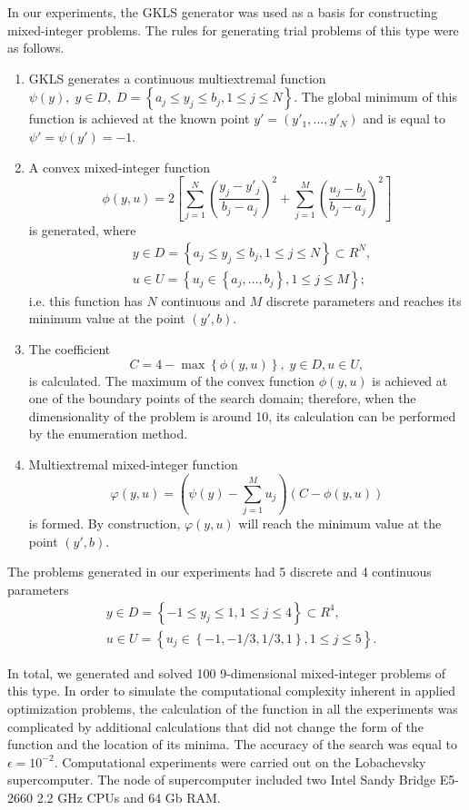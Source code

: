 \documentclass[
11pt,%
tightenlines,%
twoside,%
onecolumn,%
nofloats,%
nobibnotes,%
nofootinbib,%
superscriptaddress,%
noshowpacs,%
centertags]%
{revtex4}
\begin{document}
In our experiments, the GKLS generator was used as a basis for constructing mixed-integer problems. The rules for generating trial problems of this type were as follows.

\begin{enumerate}
	\item GKLS generates a continuous multiextremal function $\psi(y), \; y\in D, \; D = \left\{ a_j\leq y_j\leq b_j, 1\leq j \leq N \right\}$. The global minimum of this function is achieved at the known point $y'=(y'_1,...,y'_N)$ and is equal to $\psi'=\psi(y')=-1$.
	\item A convex mixed-integer function
	\[
			\phi (y,u) = 2 \left[ \sum_{j=1}^N \left( \frac{y_j - y'_j}{b_j-a_j} \right)^2 + \sum_{j=1}^M \left( \frac{u_j - b_j}{b_j-a_j} \right)^2 \right]
	\]
	is generated, where 
	\begin{eqnarray*}
	& y\in D = \left\{ a_j\leq y_j\leq b_j, 1\leq j \leq N \right\} \subset R^N, \\
	& u\in U = \left\{ u_j \in  \left\{a_j, ..., b_j \right\}, 1\leq j \leq M \right\};
	\end{eqnarray*}
	i.e. this function has $N$ continuous and $M$ discrete parameters and reaches its minimum value at the point $(y',b)$.
	\item The coefficient
	\[
	C = 4 - \max \left\{ \phi(y,u) \right\}, \; y\in D, u \in U,
	\]
	is calculated. The maximum of the convex function $\phi(y,u)$ is achieved at one of the boundary points of the search domain; therefore, when the dimensionality of the problem is around 10, its calculation can be performed by the enumeration method. 
	\item  Multiextremal mixed-integer function
	\[
	\varphi(y,u) = \left(\psi(y) - \sum_{j=1}^M{u_j}\right)\left(C - \phi(y,u)\right)
	\]
	is formed. By construction, $\varphi(y,u)$ will reach the minimum value at the point $(y',b)$.
	
\end{enumerate}


The problems generated in our experiments had 5 discrete and 4 continuous parameters 
	\begin{eqnarray*}
	& y\in D = \left\{ -1 \leq y_j\leq 1, 1\leq j \leq 4 \right\} \subset R^4, \\
	& u\in U = \left\{ u_j \in  \left\{-1, -1/3, 1/3, 1 \right\}, 1\leq j \leq 5 \right\}.
	\end{eqnarray*}


In total, we generated and solved 100 9-dimensional mixed-integer problems of this type. In order to simulate the computational complexity inherent in applied optimization problems, the calculation of the function in all the experiments was complicated by additional calculations that did not change the form of the function and the location of its minima.
The accuracy of the search was equal to $\epsilon = 10^{-2}$. Computational experiments were carried out on the Lobachevsky supercomputer. The node of supercomputer included two Intel Sandy Bridge E5-2660 2.2 GHz CPUs and 64 Gb RAM. 
\end{document}
